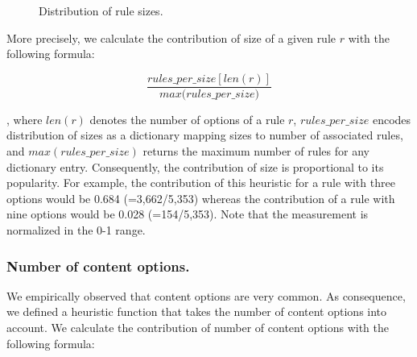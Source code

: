 \documentclass[sigconf,review, anonymous]{acmart}
\begin{document}
\begin{figure}[H]
  \centering
  \vspace{-2ex}
  \caption{\label{fig:distribution-rule-size}Distribution of rule sizes.}
\end{figure}



More precisely, we calculate the contribution of size of a given rule
$r$ with the following formula:

\[\frac{\mathit{rules\_per\_size}[\mathit{len(r)}]}{\mathit{max(rules\_per\_size})}\]

\noindent
, where $\mathit{len(r)}$ denotes the number of options of a rule $r$,
$\mathit{rules\_per\_size}$ encodes distribution of sizes as a
dictionary mapping sizes to number of associated rules, and
$\mathit{max(rules\_per\_size)}$ returns the maximum number of rules
for any dictionary entry. Consequently, the contribution of size is
proportional to its popularity. For example, the contribution of this
heuristic for a rule with three options would be 0.684 (=3,662/5,353)
whereas the contribution of a rule with nine options would be 0.028
(=154/5,353). Note that the measurement is normalized in the 0-1
range.

\subsubsection{Number of content options.} We empirically observed that content options are very
common.   As consequence, we defined a
heuristic function that takes the number of content options into
account. We calculate the contribution of number of content options
with the following formula:
\end{document}
